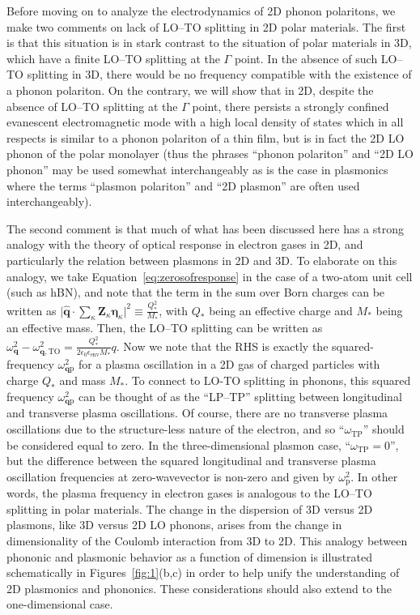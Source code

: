 \documentclass[aps,prb,twocolumn,
	           groupedaddress,superscriptaddress,
               amsfonts,amssymb,amsmath,floatfix,
	           citeautoscript]{revtex4-1}
\begin{document}
Before moving on to analyze the electrodynamics of 2D phonon polaritons, we make two comments on lack of LO--TO splitting in 2D polar materials. The first is that this situation is in stark contrast to the situation of polar materials in 3D, which have a finite LO--TO splitting at the $\Gamma$ point. In the absence of such LO--TO splitting in 3D, there would be no frequency compatible with the existence of a phonon  polariton. On the contrary, we will show that in 2D, despite the absence of LO--TO splitting at the $\Gamma$ point, there persists a strongly confined evanescent electromagnetic mode with a high local density of states which in all respects is similar to a phonon polariton of a thin film, but is in fact the 2D LO phonon of the polar monolayer (thus the phrases ``phonon polariton'' and ``2D LO phonon'' may be used somewhat interchangeably as is the case in plasmonics where the terms ``plasmon polariton'' and ``2D plasmon'' are often used interchangeably).

The second comment is that much of what has been discussed here has a strong analogy with the theory of optical response in electron gases in 2D, and particularly the relation between plasmons in 2D and 3D. To elaborate on this analogy, we take Equation~\eqref{eq:zerosofresponse} in the case of a two-atom unit cell (such as hBN), and note that the term in the sum over Born charges can be written as $\Big|\hat{\mathbf{q}}\cdot \sum_\kappa \mathbf{Z}_\kappa\boldsymbol{\eta}_\kappa\Big|^2 \equiv \frac{Q_*^2}{M_*}$, with $Q_*$ being an effective charge and $M_*$ being an effective mass. Then, the LO--TO splitting can be written as $\omega^2_{\mathbf{q}} - \omega^2_{\mathbf{q},\mathrm{TO}} = \frac{Q_*^2}{2\epsilon_0\epsilon_{\mathrm{env}} M_*}q$. Now we note that the RHS is exactly the squared-frequency $\omega^2_{\mathbf{q}\mathrm{p}}$ for a plasma oscillation in a 2D gas of charged particles with charge $Q_*$ and mass $M_*$. To connect to LO-TO splitting in phonons, this squared frequency $\omega^2_{\mathbf{q}\mathrm{p}}$ can be thought of as the ``LP--TP'' splitting between longitudinal and transverse plasma oscillations. Of course, there are no transverse plasma oscillations due to the structure-less nature of the electron, and so ``$\omega_{\mathrm{TP}}$''  should be considered equal to zero. In the three-dimensional plasmon case, ``$\omega_{\mathrm{TP}} = 0$'', but the difference between the squared longitudinal and transverse plasma oscillation frequencies at zero-wavevector is non-zero and given by $\omega_{\mathrm{p}}^2$. In other words, the plasma frequency in electron gases is analogous to the LO--TO splitting in polar materials. The change in the dispersion of 3D versus 2D plasmons, like 3D versus 2D LO phonons, arises from the change in dimensionality of the Coulomb interaction from 3D to 2D.  This analogy between phononic and plasmonic behavior as a function of dimension is illustrated schematically in Figures~\ref{fig:1}(b,c) in order to help unify the understanding of 2D plasmonics and phononics. These considerations should also extend to the one-dimensional case.
  
\end{document}
